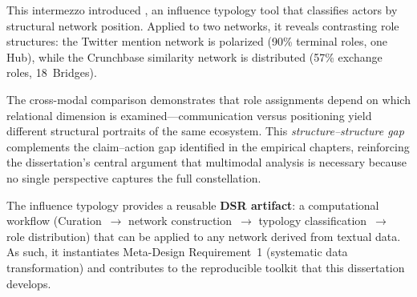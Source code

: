 \documentclass[../main.tex]{subfiles}
\begin{document}
\begin{summarybox}
This intermezzo introduced \RoleSim, an influence typology tool that
classifies actors by structural network position. Applied to two \RoleBox{}
networks, it reveals contrasting role structures: the Twitter mention network
is polarized (90\% terminal roles, one Hub), while the Crunchbase similarity
network is distributed (57\% exchange roles, 18~Bridges).

The cross-modal comparison demonstrates that role assignments depend on
which relational dimension is examined---communication versus positioning
yield different structural portraits of the same ecosystem. This
\emph{structure--structure gap} complements the claim--action gap identified
in the empirical chapters, reinforcing the dissertation's central argument
that multimodal analysis is necessary because no single perspective captures
the full constellation.

The influence typology provides a reusable \textbf{DSR artifact}: a
computational workflow (Curation~$\to$ network construction~$\to$
typology classification~$\to$ role distribution) that can be applied
to any network derived from textual data. As such, it instantiates
Meta-Design Requirement~1 (systematic data transformation) and
contributes to the reproducible toolkit that this dissertation develops.
\end{summarybox}

\closeintermezzo
\end{document}
